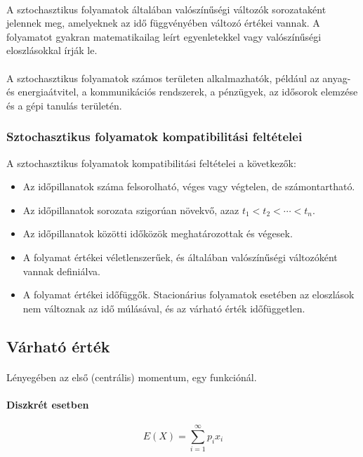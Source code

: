 \documentclass[11pt,a4paper]{article}
\begin{document}
				\paragraph{}
					A sztochasztikus folyamatok általában valószínűségi változók sorozataként jelennek meg, amelyeknek az idő függvényében változó értékei vannak. A folyamatot gyakran matematikailag leírt egyenletekkel vagy valószínűségi eloszlásokkal írják le.
				\paragraph{}
					A sztochasztikus folyamatok számos területen alkalmazhatók, például az anyag- és energiaátvitel, a kommunikációs rendszerek, a pénzügyek, az idősorok elemzése és a gépi tanulás területén.
				\subsubsection{Sztochasztikus folyamatok kompatibilitási feltételei}
					A sztochasztikus folyamatok kompatibilitási feltételei a következők:
					\begin{itemize}
					   \item Az időpillanatok száma felsorolható, véges vagy végtelen, de számontartható.
					   \item Az időpillanatok sorozata szigorúan növekvő, azaz $t_1 < t_2 < \cdots < t_n$.
					   \item Az időpillanatok közötti időközök meghatározottak és végesek.
					   \item A folyamat értékei véletlenszerűek, és általában valószínűségi változóként vannak definiálva.
					   \item A folyamat értékei időfüggők. Stacionárius folyamatok esetében az eloszlások nem változnak az idő múlásával, és az várható érték időfüggetlen.
					\end{itemize}
			\subsection{Várható érték}
				\paragraph{}
					Lényegében az első (centrális) momentum, egy funkciónál.
				\paragraph{Diszkrét esetben}
					$$E(X) = \sum_{i=1}^{\infty}p_i x_i$$
\end{document}
